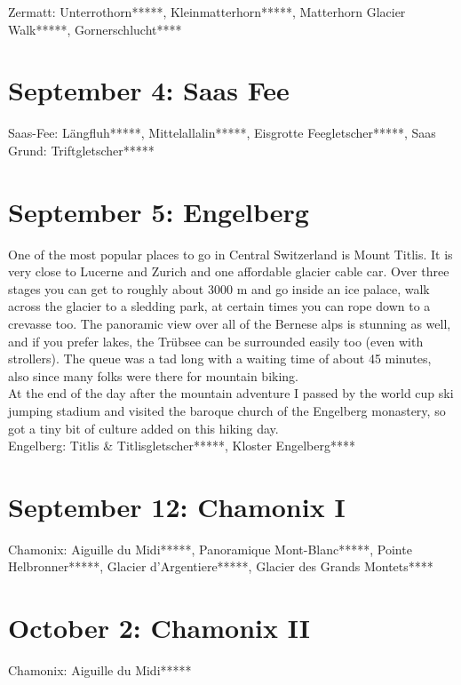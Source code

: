 Zermatt: Unterrothorn*****, Kleinmatterhorn*****, Matterhorn Glacier Walk*****, Gornerschlucht****

\section{September 4: Saas Fee}
\label{2010SaasFee}

Saas-Fee: L\"angfluh*****, Mittelallalin*****, Eisgrotte Feegletscher*****, Saas Grund: Triftgletscher*****

\section{September 5: Engelberg}
\label{2010Titlis}

One of the most popular places to go in Central Switzerland is Mount Titlis. It is very close to Lucerne and Zurich and one affordable glacier cable car. Over three stages you can get to roughly about 3000 m and go inside an ice palace, walk across the glacier to a sledding park, at certain times you can rope down to a crevasse too. The panoramic view over all of the Bernese alps is stunning as well, and if you prefer lakes, the Tr\"ubsee can be surrounded easily too (even with strollers). The queue was a tad long with a waiting time of about 45 minutes, also since many folks were there for mountain biking.\\

At the end of the day after the mountain adventure I passed by the world cup ski jumping stadium and visited the baroque church of the Engelberg monastery, so got a tiny bit of culture added on this hiking day.\\

Engelberg: Titlis \& Titlisgletscher*****, Kloster Engelberg****

\section{September 12: Chamonix I}
\label{2010ChamonixI}

Chamonix: Aiguille du Midi*****, Panoramique Mont-Blanc*****, Pointe Helbronner*****, Glacier d'Argentiere*****, Glacier des Grands Montets****

\section{October 2: Chamonix II}
\label{2010ChamonixII}

Chamonix: Aiguille du Midi*****

